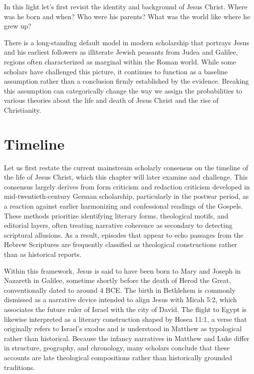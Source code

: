 In this light let's first revisit the identity and background of Jesus Christ.
Where was he born and when?
Who were his parents?
What was the world like where he grew up?

There is a long-standing default model in modern scholarship that portrays Jesus and his earliest followers as illiterate Jewish peasants from Judea and Galilee, regions often characterized as marginal within the Roman world.
While some scholars have challenged this picture, it continues to function as a baseline assumption rather than a conclusion firmly established by the evidence.
Breaking this assumption can categorically change the way we assign the probabilities to various theories about the life and death of Jesus Christ and the rise of Christianity.

\section{Timeline}\label{sec:historical-background}

Let us first restate the current mainstream scholarly consensus on the timeline of the life of Jesus Christ, which this chapter will later examine and challenge.
This consensus largely derives from form criticism and redaction criticism developed in mid-twentieth-century German scholarship, particularly in the postwar period, as a reaction against earlier harmonizing and confessional readings of the Gospels.
These methods prioritize identifying literary forms, theological motifs, and editorial layers, often treating narrative coherence as secondary to detecting scriptural allusions.
As a result, episodes that appear to echo passages from the Hebrew Scriptures are frequently classified as theological constructions rather than as historical reports.

Within this framework, Jesus is said to have been born to Mary and Joseph in Nazareth in Galilee, sometime shortly before the death of Herod the Great, conventionally dated to around 4 BCE.
The birth in Bethlehem is commonly dismissed as a narrative device intended to align Jesus with Micah 5:2, which associates the future ruler of Israel with the city of David.
The flight to Egypt is likewise interpreted as a literary construction shaped by Hosea 11:1, a verse that originally refers to Israel's exodus and is understood in Matthew as typological rather than historical.
Because the infancy narratives in Matthew and Luke differ in structure, geography, and chronology, many scholars conclude that these accounts are late theological compositions rather than historically grounded traditions.

